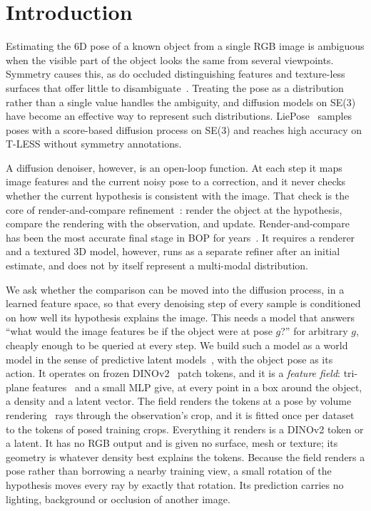 \section{Introduction}
\label{sec:intro}

Estimating the 6D pose of a known object from a single RGB image is ambiguous when the visible part of the object looks the same from
several viewpoints. Symmetry causes this, as do occluded distinguishing features and texture-less surfaces that offer little to
disambiguate~\cite{hodan2017tless,hodan2020epos,murphy2021ipdf}. Treating the pose as a distribution rather than a single value handles
the ambiguity, and diffusion models on SE(3) have become an effective way to represent such distributions.
LiePose~\cite{hsiao2024liepose} samples poses with a score-based diffusion process on SE(3) and reaches high accuracy on T-LESS
without symmetry annotations.

A diffusion denoiser, however, is an open-loop function. At each step it maps image features and the current noisy pose to a
correction, and it never checks whether the current hypothesis is consistent with the image. That check is the core of
render-and-compare refinement~\cite{li2018deepim,labbe2020cosypose,labbe2022megapose,wen2024foundationpose}: render the object at the
hypothesis, compare the rendering with the observation, and update. Render-and-compare has been the most accurate final stage in BOP
for years~\cite{hodan2020bop,sundermeyer2023bop22}. It requires a renderer and a textured 3D model, however, runs as a separate refiner
after an initial estimate, and does not by itself represent a multi-modal distribution.

We ask whether the comparison can be moved into the diffusion process, in a learned feature space, so that every denoising step of
every sample is conditioned on how well its hypothesis explains the image. This needs a model that answers ``what would the image
features be if the object were at pose $g$?'' for arbitrary $g$, cheaply enough to be queried at every step. We build such a model as a
world model in the sense of predictive latent models~\cite{assran2023ijepa,bardes2024vjepa,zhou2025dinowm}, with the object pose as
its action. It operates on frozen DINOv2~\cite{oquab2024dinov2} patch tokens, and it is a \emph{feature field}: tri-plane
features~\cite{chan2022eg3d} and a small MLP give, at every point in a box around the object, a density and a latent vector. The field
renders the tokens at a pose by volume rendering~\cite{mildenhall2020nerf} rays through the observation's crop, and it is fitted
once per dataset to the tokens of posed training crops. Everything it renders is a DINOv2 token or a latent. It has no RGB output and is
given no surface, mesh or texture; its geometry is whatever density best explains the tokens. Because the field renders a pose rather
than borrowing a nearby training view, a small rotation of the hypothesis moves every ray by exactly that rotation. Its prediction
carries no lighting, background or occlusion of another image.

